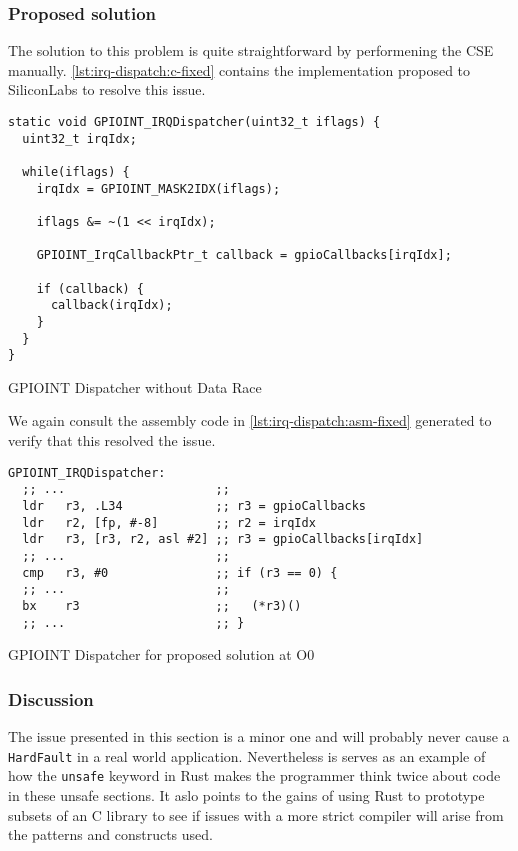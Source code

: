 \subsubsection{Proposed solution}

The solution to this problem is quite straightforward by performening the \gls{CSE} manually.
\autoref{lst:irq-dispatch:c-fixed} contains the implementation proposed to SiliconLabs to resolve this issue.

\begin{listing}[H]
  \begin{verbatim}
static void GPIOINT_IRQDispatcher(uint32_t iflags) {
  uint32_t irqIdx;

  while(iflags) {
    irqIdx = GPIOINT_MASK2IDX(iflags);

    iflags &= ~(1 << irqIdx);

    GPIOINT_IrqCallbackPtr_t callback = gpioCallbacks[irqIdx];

    if (callback) {
      callback(irqIdx);
    }
  }
}
  \end{verbatim}
  \caption{GPIOINT Dispatcher without Data Race}
  \label{lst:irq-dispatch:c-fixed}
\end{listing}

We again consult the assembly code in \autoref{lst:irq-dispatch:asm-fixed} generated to verify that this resolved the issue.

\begin{listing}[H]
  \begin{verbatim}
GPIOINT_IRQDispatcher:
  ;; ...                     ;;
  ldr   r3, .L34             ;; r3 = gpioCallbacks
  ldr   r2, [fp, #-8]        ;; r2 = irqIdx
  ldr   r3, [r3, r2, asl #2] ;; r3 = gpioCallbacks[irqIdx]
  ;; ...                     ;;
  cmp   r3, #0               ;; if (r3 == 0) {
  ;; ...                     ;;
  bx    r3                   ;;   (*r3)()
  ;; ...                     ;; }
  \end{verbatim}
  \caption{GPIOINT Dispatcher for proposed solution at O0}
  \label{lst:irq-dispatch:asm-fixed}
\end{listing}

\subsubsection{Discussion}

The issue presented in this section is a minor one and will probably never cause a \texttt{HardFault} in a real world application.
Nevertheless is serves as an example of how the \texttt{unsafe} keyword in Rust makes the programmer think twice about code in these unsafe sections.
It aslo points to the gains of using Rust to prototype subsets of an C library to see if issues with a more strict compiler will arise from the patterns and constructs used.

